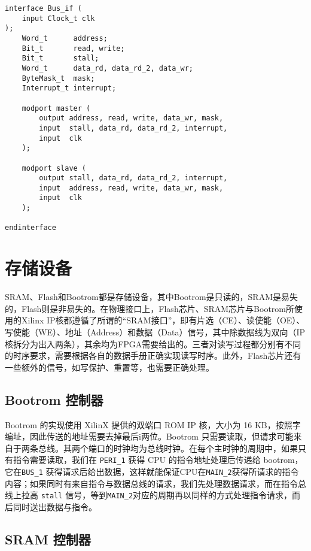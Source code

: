 \begin{verbatim}
interface Bus_if (
    input Clock_t clk
);
    Word_t      address;
    Bit_t       read, write;
    Bit_t       stall;
    Word_t      data_rd, data_rd_2, data_wr;
    ByteMask_t  mask;
    Interrupt_t interrupt;

    modport master (
        output address, read, write, data_wr, mask,
        input  stall, data_rd, data_rd_2, interrupt,
        input  clk
    );

    modport slave (
        output stall, data_rd, data_rd_2, interrupt,
        input  address, read, write, data_wr, mask,
        input  clk
    );

endinterface
\end{verbatim}

\section{存储设备}

SRAM、Flash和Bootrom都是存储设备，其中Bootrom是只读的，SRAM是易失的，Flash则是非易失的。在物理接口上，Flash芯片、SRAM芯片与Bootrom所使用的Xilinx IP核都遵循了所谓的“SRAM接口”，即有片选（CE）、读使能（OE）、写使能（WE）、地址（Address）和数据（Data）信号，其中除数据线为双向（IP核拆分为出入两条），其余均为FPGA需要给出的。三者对读写过程都分别有不同的时序要求，需要根据各自的数据手册正确实现读写时序。此外，Flash芯片还有一些额外的信号，如写保护、重置等，也需要正确处理。

\subsection{Bootrom 控制器}

Bootrom 的实现使用 XilinX 提供的双端口 ROM IP 核，大小为 16 KB，按照字编址，因此传送的地址需要去掉最后i两位。Bootrom 只需要读取，但请求可能来自于两条总线。其两个端口的时钟均为总线时钟。在每个主时钟的周期中，如果只有指令需要读取，我们在 \texttt{PERI\_1} 获得 CPU 的指令地址处理后传递给 bootrom，它在\texttt{BUS\_1} 获得请求后给出数据，这样就能保证CPU在\texttt{MAIN\_2}获得所请求的指令内容；如果同时有来自指令与数据总线的请求，我们先处理数据请求，而在指令总线上拉高 \texttt{stall} 信号，等到\texttt{MAIN\_2}对应的周期再以同样的方式处理指令请求，而后同时送出数据与指令。

\subsection{SRAM 控制器}

